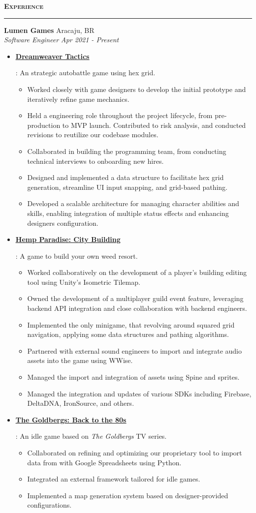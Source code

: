 \documentclass{article}
\newcommand{\resumeItem}[2]{
  \item{
    \textbf{#1}{: #2 \vspace{-5pt}}
  }
}
\newcommand{\simpleItem}[1]{
  \item{
    #1 \vspace{-3pt}
  }
}
\newcommand{\resumeSubheading}[4]{
  \noindent
  \textbf{#1} \dotfill #2 \\
  \resumeSubSubheading{#3}{#4}
}
\newcommand{\resumeSubSubheading}[2]{
    \noindent
    \vspace{5pt}
    \textit{#1} \dotfill \textit{ #2} \\
}
\newcommand{\resumeSubHeadingListStart}{\vspace{-10pt}\begin{itemize}}
\newcommand{\resumeSubHeadingListEnd}{\end{itemize}}
\newcommand{\resumeSubItemListStart}{\vspace{-5pt}\begin{itemize}}
\newcommand{\resumeSubItemListEnd}{\end{itemize}}
\newcommand{\resumeSection}[1]{
  \vspace{5pt}
  {\Large\textbf{\textsc{#1}}} \\
  \par\nobreak\vspace{-6pt}\noindent\textcolor{black}{\rule{\linewidth}{0.4pt}}%
}
\begin{document}
\resumeSection{Experience}
    \resumeSubheading
      {Lumen Games}{Aracaju, BR}
      {Software Engineer}{Apr 2021 - Present}
      \resumeSubHeadingListStart
        \resumeItem
          {\href{https://play.google.com/store/apps/details?id=games.lumen.homatales}{\color{blue}\underline{Dreamweaver Tactics}}}
          {An strategic autobattle game using hex grid.
            \resumeSubItemListStart
              \simpleItem{Worked closely with game designers to develop the initial prototype and iteratively refine game mechanics.}
              \simpleItem{Held a engineering role throughout the project lifecycle, from pre-production to MVP launch. Contributed to risk analysis, and conducted revisions to reutilize our codebase modules.}
              \simpleItem{Collaborated in building the programming team, from conducting technical interviews to onboarding new hires.}
              \simpleItem{Designed and implemented a data structure to facilitate hex grid generation, streamline UI input snapping, and grid-based pathing.}
              \simpleItem{Developed a scalable architecture for managing character abilities and skills, enabling integration of multiple status effects and enhancing designers configuration.}
            \resumeSubItemListEnd
          }
        \resumeItem
          {\href{https://play.google.com/store/apps/details?id=games.redhood.hempparadise}{\color{blue}\underline{Hemp Paradise: City Building}}}
          {A game to build your own weed resort.
            \resumeSubItemListStart
              \simpleItem{Worked collaboratively on the development of a player's building editing tool using Unity's Isometric Tilemap.}
              \simpleItem{Owned the development of a multiplayer guild event feature, leveraging backend API integration and close collaboration with backend engineers.}
              \simpleItem{Implemented the only minigame, that revolving around squared grid navigation, applying some data structures and pathing algorithms.}
              \simpleItem{Partnered with external sound engineers to import and integrate audio assets into the game using WWise.}
              \simpleItem{Managed the import and integration of assets using Spine and sprites.}
              \simpleItem{Managed the integration and updates of various SDKs including Firebase, DeltaDNA, IronSource, and others.}
            \resumeSubItemListEnd
          }
        \resumeItem
          {\href{https://play.google.com/store/apps/details?id=com.eastsidegames.thegoldbergs}{\color{blue}\underline{The Goldbergs: Back to the 80s}}}
          {An idle game based on \textit{The Goldbergs} TV series.
            \resumeSubItemListStart
              \simpleItem{Collaborated on refining and optimizing our proprietary tool to import data from with Google Spreadsheets using Python.}
              \simpleItem{Integrated an external framework tailored for idle games.}
              \simpleItem{Implemented a map generation system based on designer-provided configurations.}
            \resumeSubItemListEnd
          }
      \resumeSubHeadingListEnd
\end{document}
